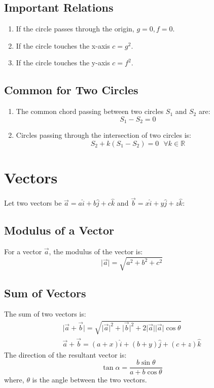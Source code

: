 \documentclass[openany, oneside]{book}
\begin{document}
\section{Important Relations}
\begin{enumerate}
\item If the circle passes through the origin, $g=0,f=0$.
\item If the circle touches the x-axis $c=g^2$.
\item If the circle touches the y-axis $c=f^2$.
\end{enumerate}

\section*{Common for Two Circles}
\begin{enumerate}
\item The common chord passing between two circles $S_1$ and $S_2$ are:
\begin{equation}
S_1-S_2=0
\end{equation}
\item Circles passing through the intersection of two circles is:
\begin{equation}
S_2+k(S_1-S_2)=0\text{ }\forall k\in\mathbb{R}
\end{equation}
\end{enumerate}

\large{\chapter{Vectors}}
Let two vectors be $\vec{a}=a\hat{i}+b\hat{j}+c\hat{k}$ and $\vec{b}=x\hat{i}+y\hat{j}+z\hat{k}$:
\section{Modulus of a Vector}
For a vector $\vec{a}$, the modulus of the vector is:
\begin{equation}
\lvert \vec{a} \rvert = \sqrt{a^2+b^2+c^2}
\end{equation}

\section{Sum of Vectors}
The sum of two vectors is:
\begin{align}
\lvert \vec{a}+\vec{b} \rvert=\sqrt{\lvert \vec{a} \rvert^2+\lvert \vec{b} \rvert^2+2\lvert \vec{a} \rvert \lvert \vec{a} \rvert\cos \theta}\\
\vec{a}+\vec{b}=(a+x)\hat{i}+(b+y)\hat{j}+(c+z)\hat{k}
\end{align}
The direction of the resultant vector is:
\begin{equation}
\tan \alpha=\dfrac{b\sin\theta}{a+b\cos\theta}
\end{equation}
where, $\theta$ is the angle between the two vectors.
\end{document}
